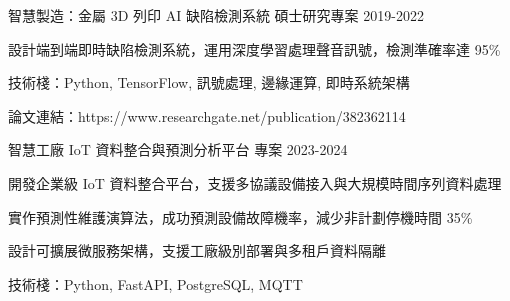 
\begin{cventries}
  \cventry
    {智慧製造：金屬 3D 列印 AI 缺陷檢測系統} %
    {碩士研究專案} %
    {} %
    {2019-2022} %
    {
      \begin{cvitems} %
        \item {設計端到端即時缺陷檢測系統，運用深度學習處理聲音訊號，檢測準確率達 95\%}
        \item {技術棧：Python, TensorFlow, 訊號處理, 邊緣運算, 即時系統架構}
        \item {論文連結：https://www.researchgate.net/publication/382362114}
      \end{cvitems}
    }
    
  \vspace{2mm} %
  
  \cventry
    {智慧工廠 IoT 資料整合與預測分析平台} %
    {專案} %
    {} %
    {2023-2024} %
    {
      \begin{cvitems} %
        \item {開發企業級 IoT 資料整合平台，支援多協議設備接入與大規模時間序列資料處理}
        \item {實作預測性維護演算法，成功預測設備故障機率，減少非計劃停機時間 35\%}
        \item {設計可擴展微服務架構，支援工廠級別部署與多租戶資料隔離}
        \item {技術棧：Python, FastAPI, PostgreSQL, MQTT}
      \end{cvitems}
    }
\end{cventries}